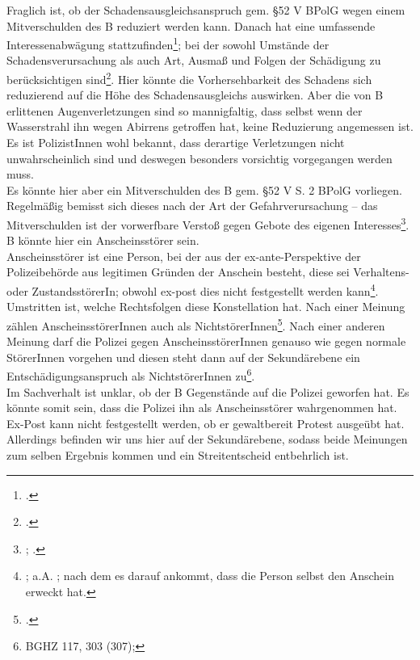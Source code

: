 \documentclass[widefront, ngerman]{jura}
\begin{document}
Fraglich ist, ob der Schadensausgleichsanspruch gem. §52 V BPolG wegen einem Mitverschulden des B reduziert werden kann.
Danach hat eine umfassende Interessenabwägung stattzufinden\footcite[§ 66 Rn 10]{HornmannHSOG}; bei der sowohl Umstände der Schadensverursachung als auch Art, Ausmaß und Folgen der Schädigung zu berücksichtigen sind\footcite[§52 BPolG Rn 10]{BPolGKommentar}.
Hier könnte die Vorhersehbarkeit des Schadens sich reduzierend auf die Höhe des Schadensausgleichs auswirken. Aber die von B erlittenen Augenverletzungen sind so
mannigfaltig, dass selbst wenn der Wasserstrahl ihn wegen Abirrens getroffen hat, keine Reduzierung angemessen ist. Es ist PolizistInnen wohl bekannt, dass derartige Verletzungen nicht unwahrscheinlich sind und deswegen besonders vorsichtig vorgegangen werden muss.\\
Es könnte hier aber ein Mitverschulden des B gem. §52 V S. 2 BPolG vorliegen. Regelmäßig bemisst sich dieses nach der Art der Gefahrverursachung -- das Mitverschulden ist der vorwerfbare Verstoß gegen Gebote des eigenen Interesses\footnote{\cite[Rachor][L Rn 109]{HandbuchPolizeirecht}; \cite[§26 Rn 30]{PierothSchlinkPolizei}.}. B könnte hier ein Anscheinsstörer sein.\\
Anscheinsstörer ist eine Person, bei der aus der ex-ante-Perspektive der Polizeibehörde aus legitimen Gründen der Anschein besteht, diese sei Verhaltens- oder ZustandsstörerIn; obwohl ex-post dies nicht festgestellt werden kann\footnote{\cite[Rn 253]{Schenke}; a.A. \cite[Rn 95]{Knemeyer}; nach dem es darauf ankommt, dass die Person selbst den Anschein erweckt hat.}. Umstritten ist, welche Rechtsfolgen diese Konstellation hat. Nach einer Meinung zählen AnscheinsstörerInnen auch als NichtstörerInnen\footcite[Rn 254]{Schenke}. Nach einer anderen Meinung darf die Polizei gegen AnscheinsstörerInnen genauso wie gegen normale StörerInnen vorgehen und diesen steht dann auf der Sekundärebene ein Entschädigungsanspruch als NichtstörerInnen zu\footnote{BGHZ 117, 303 (307);\cite[§9 Rn 21]{PierothSchlinkPolizei}}.\\
Im Sachverhalt ist unklar, ob der B Gegenstände auf die Polizei geworfen hat. Es könnte somit sein, dass die Polizei ihn als Anscheinsstörer wahrgenommen hat. Ex-Post kann nicht festgestellt werden, ob er gewaltbereit Protest ausgeübt hat. Allerdings befinden wir uns hier auf der Sekundärebene, sodass beide Meinungen zum selben Ergebnis kommen und ein Streitentscheid entbehrlich ist.\\
\end{document}
